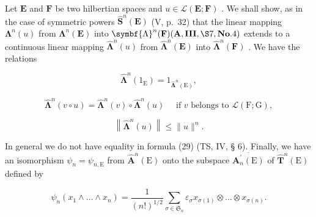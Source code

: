 Let \(\mathbf{E}\) and \(\mathbf{F}\) be two hilbertian spaces and \(u \in \mathcal{L}(\mathbf{E};\mathbf{F})\) . We shall show, as in the case of symmetric powers \(\hat{\mathbf{S}}^n (\mathbf{E})\) (V, p.~32) that the linear mapping \(\symbf{\Lambda}^n (u)\) from \(\symbf{\Lambda}^n (\mathbf{E})\) into \(\symbf{\Lambda}^n (\mathbf{F})(\mathbf{A},\mathbf{III},\S 7,\mathbf{No}.4)\) extends to a continuous linear mapping \(\hat{\symbf{\Lambda}}^n (u)\) from \(\hat{\symbf{\Lambda}}^n (\mathbf{E})\) into \(\hat{\symbf{\Lambda}}^n (\mathbf{F})\) . We have the relations

\[
\hat {\symbf {\Lambda}} ^ {n} (1 _ {\mathrm{E}}) = 1 _ {\hat {\symbf {\Lambda}} ^ {n} (\mathrm{E})},\tag{27}
\]

\[
\hat {\symbf {\Lambda}} ^ {n} (v \circ u) = \hat {\symbf {\Lambda}} ^ {n} (v) \circ \hat {\symbf {\Lambda}} ^ {n} (u) \quad \text { if } v \text { belongs   to } \mathscr {L} (\mathrm{F}; \mathrm{G}),\tag{28}
\]

\[
\left\| \hat {\symbf {\Lambda}} ^ {n} (u) \right\| \leqslant \| u \| ^ {n}.\tag{29}
\]

In general we do not have equality in formula (29) (TS, IV, § 6). Finally, we have an isomorphism \(\psi_{n} = \psi_{n,\mathrm{E}}\) from \(\hat{\mathbf{A}}^{n}(\mathrm{E})\) onto the subspace \(\overline{\mathbf{A}_{n}^{\prime}(\mathrm{E})}\) of \(\hat{\mathbf{T}}^{n}(\mathrm{E})\) defined by

\[
\psi_ {n} (x _ {1} \wedge \dots \wedge x _ {n}) = \frac {1}{(n !) ^ {1 / 2}} \sum_ {\sigma \in \mathfrak {S} _ {n}} \varepsilon_ {\sigma} x _ {\sigma (1)} \otimes \dots \otimes x _ {\sigma (n)}.\tag{30}
\]

